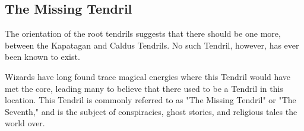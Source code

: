 \begin{multicols}{2}
\section{The Missing Tendril}
 The orientation of the root tendrils suggests that there should be one more, between the Kapatagan and Caldus Tendrils.
No such Tendril, however, has ever been known to exist.

Wizards have long found trace magical energies where this Tendril would have met the core, leading many to believe that there used to be a Tendril in this location.
This Tendril is commonly referred to as "The Missing Tendril" or "The Seventh," and is the subject of conspiracies, ghost stories, and religious tales the world over.

\end{multicols}
